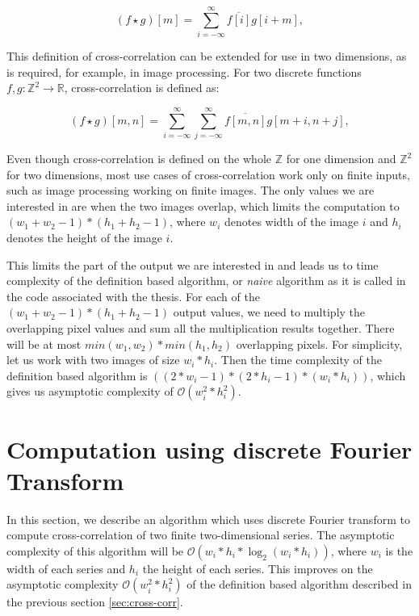 \[
(f \star g)[m] = \sum_{i=-\infty}^{\infty} \overline{f[i]}g[i + m],
\] 



This definition of cross-correlation can be extended for use in two dimensions, as is required, for example, in image processing.
For two discrete functions \( f, g : \mathbb{Z}^2 \rightarrow \mathbb{R} \), cross-correlation is defined as:

\[
(f \star g)[m,n] = \sum_{i=-\infty}^{\infty} \sum_{j=-\infty}^{\infty} \overline{f[m,n]}g[m + i,n + j],
\]

Even though cross-correlation is defined on the whole $\mathbb{Z}$ for one dimension and $\mathbb{Z}^2$ for two dimensions, most use cases of cross-correlation work only on finite inputs, such as image processing working on finite images. The only values we are interested in are when the two images overlap, which limits the computation to $(w_1 + w_2 - 1) * (h_1 + h_2 - 1)$, where $w_i$ denotes width of the image $i$ and $h_i$ denotes the height of the image $i$.

This limits the part of the output we are interested in and leads us to time complexity of the definition based algorithm, or \textit{naive} algorithm as it is called in the code associated with the thesis. For each of the $(w_1 + w_2 - 1) * (h_1 + h_2 - 1)$ output values, we need to multiply the overlapping pixel values and sum all the multiplication results together. There will be at most $min(w_1, w_2) * min(h_1, h_2)$ overlapping pixels. For simplicity, let us work with two images of size $w_i*h_i$. Then the time complexity of the definition based algorithm is $((2*w_i-1)*(2 * h_i - 1) * (w_i * h_i))$, which gives us asymptotic complexity of $\mathcal{O}(w_i^2*h_i^2)$.

\section{Computation using discrete Fourier Transform}
\label{sec:cross_corr_fft}

In this section, we describe an algorithm which uses discrete Fourier transform to compute cross-correlation of two finite two-dimensional series. The asymptotic complexity of this algorithm will be $\mathcal{O}(w_i*h_i*\log_2(w_i*h_i))$, where $w_i$ is the width of each series and $h_i$ the height of each series. This improves on the asymptotic complexity $\mathcal{O}(w_i^2*h_i^2)$ of the definition based algorithm described in the previous section \ref{sec:cross-corr}.

